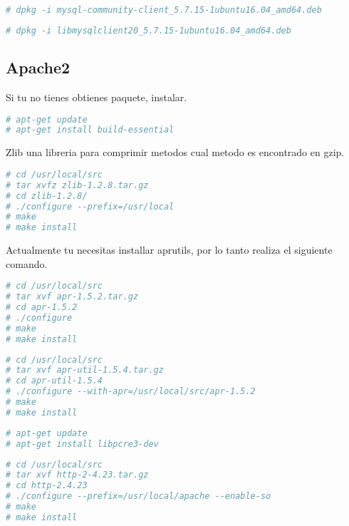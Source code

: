 \begin{lstlisting}[language=bash, caption={Comando resumido de instalación de servidor de base de datos}]
# dpkg -i mysql-community-client_5.7.15-1ubuntu16.04_amd64.deb 
\end{lstlisting}


\begin{lstlisting}[language=bash, caption={Comando resumido de instalación de servidor de base de datos}]
# dpkg -i libmysqlclient20_5.7.15-1ubuntu16.04_amd64.deb
\end{lstlisting}

\subsection{Apache2}

Si tu no tienes obtienes  paquete, instalar.

\begin{lstlisting}[language=bash, caption={}]
# apt-get update
# apt-get install build-essential
\end{lstlisting}

Zlib una libreria para comprimir metodos cual metodo es encontrado en gzip.

\begin{lstlisting}[language=bash, caption={}]
# cd /usr/local/src
# tar xvfz zlib-1.2.8.tar.gz
# cd zlib-1.2.8/
# ./configure --prefix=/usr/local
# make
# make install
\end{lstlisting}

Actualmente tu necesitas installar aprutils, por lo tanto realiza el siguiente comando.

\begin{lstlisting}[language=bash, caption={}]
# cd /usr/local/src
# tar xvf apr-1.5.2.tar.gz
# cd apr-1.5.2
# ./configure
# make
# make install
\end{lstlisting}


\begin{lstlisting}[language=bash, caption={}]
# cd /usr/local/src
# tar xvf apr-util-1.5.4.tar.gz
# cd apr-util-1.5.4
# ./configure --with-apr=/usr/local/src/apr-1.5.2
# make
# make install
\end{lstlisting}

\begin{lstlisting}[language=bash, caption={}]
# apt-get update
# apt-get install libpcre3-dev
\end{lstlisting}

\begin{lstlisting}[language=bash, caption={}]
# cd /usr/local/src
# tar xvf http-2-4.23.tar.gz
# cd http-2.4.23
# ./configure --prefix=/usr/local/apache --enable-so 
# make
# make install
\end{lstlisting}

